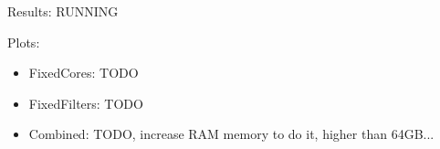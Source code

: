 \documentclass[12pt,a4paper]{article}
\begin{document}
Results: RUNNING

Plots:
\begin{itemize}
    \item FixedCores: TODO
    \item FixedFilters: TODO
    \item Combined: TODO, increase RAM memory to do it, higher than 64GB...
\end{itemize}
\end{document}

